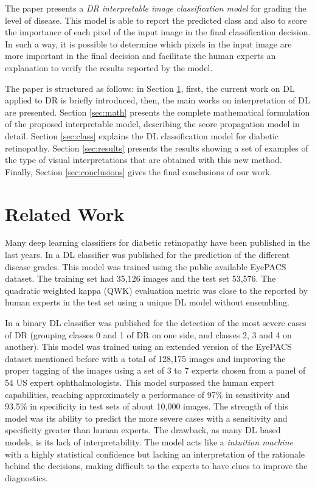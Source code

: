\documentclass[review]{elsarticle}
\theoremstyle{definition} %
\theoremstyle{remark}
\begin{document}
The paper presents a \emph{DR interpretable image classification model} for grading the level of disease. This model is able to report the predicted class and also to score the importance of each pixel of the input image in the final classification decision. In such a way, it is possible to determine which pixels in the input image are more important in the final decision and facilitate the human experts an explanation to verify the results reported by the model.

The paper is structured as follows: in Section \ref{sec:related}, first, the current work on DL applied to DR is briefly introduced, then, the main works on interpretation of DL are presented. Section \ref{sec:math} presents the complete mathematical formulation of the proposed interpretable model, describing the score propagation model in detail. Section \ref{sec:class} explains the DL classification model for diabetic retinopathy. Section \ref{sec:results} presents the results showing a set of examples of the type of visual interpretations that are obtained with this new method. Finally, Section \ref{sec:conclusions} gives the final conclusions of our work.


\section{Related Work}\label{sec:related}

Many deep learning classifiers for diabetic retinopathy have been published in the last years. In \cite{DELATORRE2017} a DL classifier was published for the prediction of the different disease grades. This model was trained using the public available EyePACS dataset. The training set had 35,126 images and the test set 53,576. The quadratic weighted kappa (QWK) evaluation metric \cite{cohen1968weighted} was close to the reported by human experts in the test set using a unique DL model without ensembling. 

In \cite{doi:10.1001/jama.2016.17216} a binary DL classifier was published for the detection of the most severe cases of DR (grouping classes 0 and 1 of DR on one side, and classes 2, 3 and 4 on another). This model was trained using an extended version of the EyePACS dataset mentioned before with a total of 128,175 images and improving the proper tagging of the images using a set of 3 to 7 experts chosen from a panel of 54 US expert ophthalmologists. This model surpassed the human expert capabilities, reaching approximately a performance of 97\% in sensitivity and 93.5\% in specificity in test sets of about 10,000 images. The strength of this model was its ability to predict the more severe cases with a sensitivity and specificity greater than human experts. The drawback, as many DL based models, is its lack of interpretability. The model acts like a \emph{intuition machine} with a highly statistical confidence but lacking an interpretation of the rationale behind the decisions, making difficult to the experts to have clues to improve the diagnostics.
\end{document}
